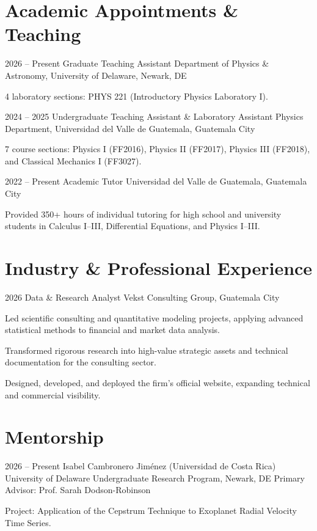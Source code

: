 \documentclass[11pt, a4paper]{article}
\begin{document}
\section{Academic Appointments \& Teaching}

\rubenzahlEntry
    {2026 – Present}
    {Graduate Teaching Assistant}
    {Department of Physics \& Astronomy, University of Delaware, Newark, DE}
    {}
    {
        \item 4 laboratory sections: PHYS 221 (Introductory Physics Laboratory I).
    }

\rubenzahlEntry
    {2024 – 2025}
    {Undergraduate Teaching Assistant \& Laboratory Assistant}
    {Physics Department, Universidad del Valle de Guatemala, Guatemala City}
    {}
    {
        \item 7 course sections: Physics I (FF2016), Physics II (FF2017), Physics III (FF2018), and Classical Mechanics I (FF3027).
    }

\rubenzahlEntry
    {2022 – Present}
    {Academic Tutor}
    {Universidad del Valle de Guatemala, Guatemala City}
    {}
    {
        \item Provided 350+ hours of individual tutoring for high school and university students in Calculus I–III, Differential Equations, and Physics I–III.
    }

\section{Industry \& Professional Experience}

\rubenzahlEntry
    {2026}
    {Data \& Research Analyst}
    {Vekst Consulting Group, Guatemala City}
    {}
    {
        \item Led scientific consulting and quantitative modeling projects, applying advanced statistical methods to financial and market data analysis.
        \item Transformed rigorous research into high-value strategic assets and technical documentation for the consulting sector.
        \item Designed, developed, and deployed the firm's official website, expanding technical and commercial visibility.
    }

\section{Mentorship}

\rubenzahlEntry
    {2026 – Present}
    {Isabel Cambronero Jiménez (Universidad de Costa Rica)}
    {University of Delaware Undergraduate Research Program, Newark, DE}
    {Primary Advisor: Prof. Sarah Dodson-Robinson}
    {
        \item Project: Application of the Cepstrum Technique to Exoplanet Radial Velocity Time Series.
    }
\end{document}
